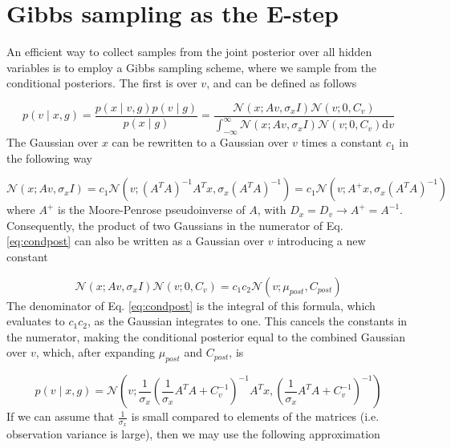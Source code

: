 \documentclass{paper}
\begin{document}
\section{Gibbs sampling as the E-step}

An efficient way to collect samples from the joint posterior over all hidden variables is to employ a Gibbs sampling scheme, where we sample from the conditional posteriors. The first is over $v$, and can be defined as follows

\begin{equation} \label{eq:condpost}
p(v \mid x,g) = \frac{p(x \mid v,g) p(v \mid g)}{p(x \mid g)} = \frac{\mathcal{N}(x;Av,\sigma_x I) \mathcal{N}(v;0,C_v)}{\int_{-\infty}^{\infty} \mathcal{N}(x;Av,\sigma_x I) \mathcal{N}(v;0,C_v) \mathrm{d}v}
\end{equation}
%
The Gaussian over $x$ can be rewritten to a Gaussian over $v$ times a constant $c_1$ in the following way

\begin{equation} \label{eq:gauss_rewrite1}
\mathcal{N}(x;Av,\sigma_x I) = c_1 \mathcal{N}(v; (A^T A)^{-1} A^T x, \sigma_x (A^T A)^{-1}) = c_1 \mathcal{N}(v; A^{+} x, \sigma_x (A^T A)^{-1})
\end{equation}
%
where $A^{+}$ is the Moore-Penrose pseudoinverse of $A$, with $D_x = D_v \rightarrow A^{+} = A^{-1}$. Consequently, the product of two Gaussians in the numerator of Eq. \ref{eq:condpost} can also be written as a Gaussian over $v$ introducing a new constant

\begin{equation} \label{eq:gauss_rewrite2}
\mathcal{N}(x;Av,\sigma_x I) \mathcal{N}(v;0,C_v) = c_1 c_2 \mathcal{N}(v; \mu_{post},C_{post})
\end{equation}
%
The denominator of Eq. \ref{eq:condpost} is the integral of this formula, which evaluates to $c_1c_2$, as the Gaussian integrates to one. This cancels the constants in the numerator, making the conditional posterior equal to the combined Gaussian over $v$, which, after expanding $\mu_{post}$ and $C_{post}$, is

\begin{equation}
p(v \mid x,g) = \mathcal{N}\left(v; \frac{1}{\sigma_x} \left(\frac{1}{\sigma_x} A^T A + C_v^{-1}\right)^{-1} A^T x, \left(\frac{1}{\sigma_x} A^T A + C_v^{-1}\right)^{-1}\right)
\end{equation}
%
If we can assume that $\frac{1}{\sigma_x}$ is small compared to elements of the matrices (i.e. observation variance is large), then we may use the following approximation
\end{document}
